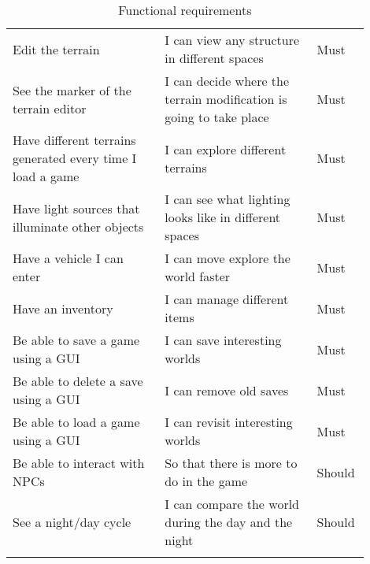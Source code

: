 \begin{longtable}{|p{0.4\linewidth}|p{0.4\linewidth}|p{0.1\linewidth}|}
    Edit the terrain                                           & I can view any structure in different spaces                       & Must           \\
    See the marker of the terrain editor                       & I can decide where the terrain modification is going to take place & Must           \\
    Have different terrains generated every time I load a game & I can explore different terrains                                   & Must           \\
    Have light sources that illuminate other objects           & I can see what lighting looks like in different spaces             & Must           \\
    Have a vehicle I can enter                                 & I can move explore the world faster                                & Must           \\
    Have an inventory                                          & I can manage different items                                       & Must           \\
    Be able to save a game using a GUI                         & I can save interesting worlds                                      & Must           \\
    Be able to delete a save using a GUI                       & I can remove old saves                                             & Must           \\
    Be able to load a game using a GUI                         & I can revisit interesting worlds                                   & Must           \\
    Be able to interact with NPCs                              & So that there is more to do in the game                            & Should         \\
    See a night/day cycle                                      & I can compare the world during the day and the night               & Should         \\
    \hline
    \caption{Functional requirements}
    \label{tab:functional_requirements}
\end{longtable}